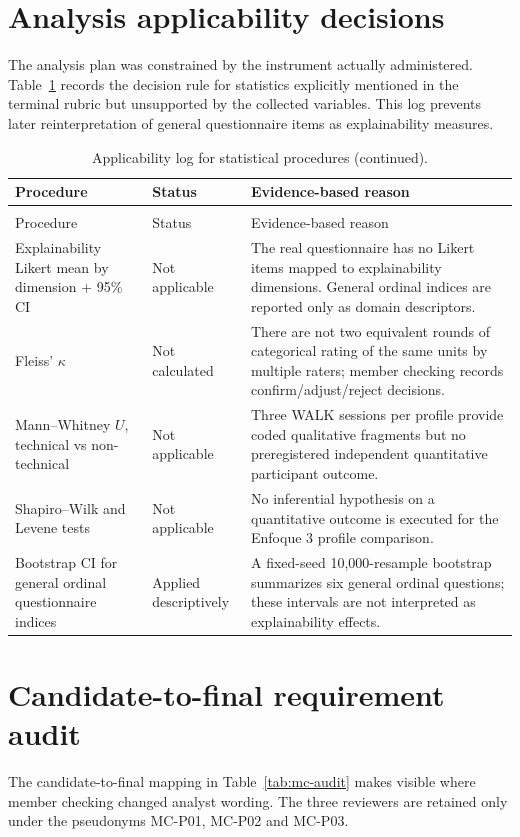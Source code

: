 \documentclass[pdflatex,sn-basic]{sn-jnl}
\begin{document}
\section{Analysis applicability decisions}\label{app:analysis-decisions}
The analysis plan was constrained by the instrument actually administered. Table~\ref{tab:applicability} records the decision rule for statistics explicitly mentioned in the terminal rubric but unsupported by the collected variables. This log prevents later reinterpretation of general questionnaire items as explainability measures.

{\footnotesize
\setlength{\tabcolsep}{2pt}
\begin{longtable}{@{}p{3.4cm}p{2.2cm}p{6.7cm}@{}}
\caption{Applicability log for statistical procedures.}\label{tab:applicability}\\
\toprule Procedure & Status & Evidence-based reason \\
\midrule
\endfirsthead
\caption[]{Applicability log for statistical procedures (continued).}\\
\toprule Procedure & Status & Evidence-based reason \\
\midrule
\endhead
\bottomrule
\endfoot
Explainability Likert mean by dimension + 95\% CI & Not applicable & The real questionnaire has no Likert items mapped to explainability dimensions. General ordinal indices are reported only as domain descriptors.\\
Fleiss' $\kappa$ & Not calculated & There are not two equivalent rounds of categorical rating of the same units by multiple raters; member checking records confirm/adjust/reject decisions.\\
Mann--Whitney $U$, technical vs non-technical & Not applicable & Three WALK sessions per profile provide coded qualitative fragments but no preregistered independent quantitative participant outcome.\\
Shapiro--Wilk and Levene tests & Not applicable & No inferential hypothesis on a quantitative outcome is executed for the Enfoque 3 profile comparison.\\
Bootstrap CI for general ordinal questionnaire indices & Applied descriptively & A fixed-seed 10,000-resample bootstrap summarizes six general ordinal questions; these intervals are not interpreted as explainability effects.\\
\end{longtable}
}

\section{Candidate-to-final requirement audit}\label{app:mc-audit}
The candidate-to-final mapping in Table~\ref{tab:mc-audit} makes visible where member checking changed analyst wording. The three reviewers are retained only under the pseudonyms MC-P01, MC-P02 and MC-P03.
\end{document}
